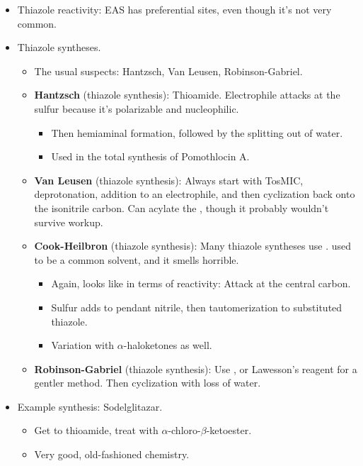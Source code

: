 \documentclass[../notes.tex]{subfiles}
\begin{document}
\begin{itemize}
\begin{itemize}
    \end{itemize}
    \item Thiazole reactivity: EAS has preferential sites, even though it's not very common.
    \item Thiazole syntheses.
    \begin{itemize}
        \item The usual suspects: Hantzsch, Van Leusen, Robinson-Gabriel.
        \item \textbf{Hantzsch} (thiazole synthesis): Thioamide. Electrophile attacks at the sulfur because it's polarizable and nucleophilic.
        \begin{itemize}
            \item Then hemiaminal formation, followed by the splitting out of water.
            \item Used in the total synthesis of Pomothlocin A.
        \end{itemize}
        \item \textbf{Van Leusen} (thiazole synthesis): Always start with TosMIC, deprotonation, addition to an electrophile, and then cyclization back onto the isonitrile carbon. Can acylate the , though it probably wouldn't survive workup.
        \item \textbf{Cook-Heilbron} (thiazole synthesis): Many thiazole syntheses use .  used to be a common solvent, and it smells horrible.
        \begin{itemize}
            \item Again,  looks like  in terms of reactivity: Attack at the central carbon.
            \item Sulfur adds to pendant nitrile, then tautomerization to substituted thiazole.
            \item Variation with $\alpha$-haloketones as well.
        \end{itemize}
        \item \textbf{Robinson-Gabriel} (thiazole synthesis): Use , or Lawesson's reagent for a gentler method. Then cyclization with loss of water.
    \end{itemize}
    \item Example synthesis: Sodelglitazar.
    \begin{itemize}
        \item Get to thioamide, treat with $\alpha$-chloro-$\beta$-ketoester.
        \item Very good, old-fashioned chemistry.
    \end{itemize}

\end{itemize}
\end{document}
